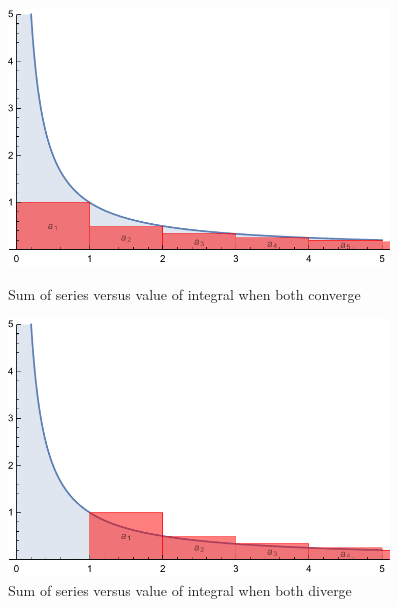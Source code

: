 \documentclass[letterpaper, 11pt, openany]{book}
\theoremstyle{mytheoremstyle}
\theoremstyle{myexamplestyle}
\begin{document}
\begin{figure}[htbp]%
    \centering
    \begin{minipage}{0.45\textwidth}%
        \centering
        \includegraphics[width=0.9\textwidth]{Figures/inttestconv.pdf}%
        \caption{Sum of series versus value of integral when both converge}%
        \label{f:inttestconv}
    \end{minipage}\hfill
    \begin{minipage}{0.45\textwidth}%
        \centering
        \includegraphics[width=0.9\textwidth]{Figures/inttestdiv.pdf}%
        \caption{Sum of series versus value of integral when both diverge}%
        \label{f:inttestdiv}
    \end{minipage}\hfill
\end{figure}
\end{document}
